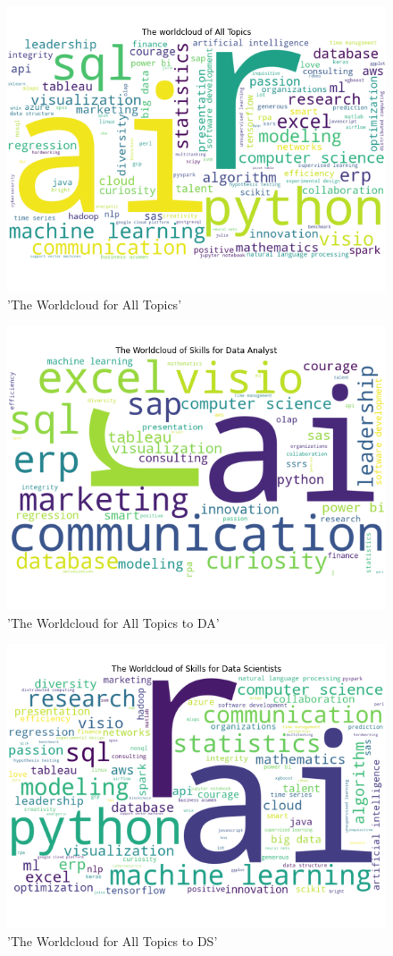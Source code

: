 \documentclass[10pt,onecolumn,letterpaper]{article}
\begin{document}
\begin{figure}[H]
  \centering
  \includegraphics[width=.75\textwidth]{f5.png}
  \caption{'The Worldcloud for All Topics'}
\end{figure}

\begin{figure}[H]
  \centering
  \includegraphics[width=.75\textwidth]{f7.png}
  \caption{'The Worldcloud for All Topics to DA'}
\end{figure}

\begin{figure}[H]
  \centering
  \includegraphics[width=.75\textwidth]{f6.png}
  \caption{'The Worldcloud for All Topics to DS'}
\end{figure}
\end{document}
